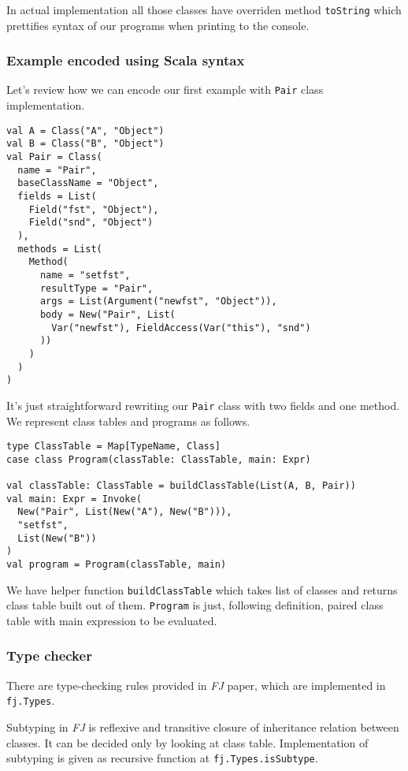 \documentclass{article}[12pt]
\begin{document}
In actual implementation all those classes have overriden
method \texttt{toString} which prettifies syntax of our
programs when printing to the console.

\subsubsection{Example encoded using Scala syntax}

Let's review how we can encode our first example with
\texttt{Pair} class implementation.

\begin{verbatim}
val A = Class("A", "Object")
val B = Class("B", "Object")
val Pair = Class(
  name = "Pair",
  baseClassName = "Object",
  fields = List(
    Field("fst", "Object"),
    Field("snd", "Object")
  ),
  methods = List(
    Method(
      name = "setfst",
      resultType = "Pair",
      args = List(Argument("newfst", "Object")),
      body = New("Pair", List(
        Var("newfst"), FieldAccess(Var("this"), "snd")
      ))
    )
  )
)
\end{verbatim}
It's just straightforward rewriting our \texttt{Pair} class
with two fields and one method. We represent class tables and
programs as follows.

\begin{verbatim}
type ClassTable = Map[TypeName, Class]
case class Program(classTable: ClassTable, main: Expr)

val classTable: ClassTable = buildClassTable(List(A, B, Pair))
val main: Expr = Invoke(
  New("Pair", List(New("A"), New("B"))),
  "setfst",
  List(New("B"))
)
val program = Program(classTable, main)
\end{verbatim}

We have helper function \texttt{buildClassTable} which takes list
of classes and returns class table built out of them.
\texttt{Program} is just, following definition, paired class table
with main expression to be evaluated.

\subsubsection{Type checker}

There are type-checking rules provided in \emph{FJ} paper, which
are implemented in \texttt{fj.Types}.

Subtyping in \emph{FJ} is reflexive and transitive closure of
inheritance relation between classes. It can be decided only by
looking at class table. Implementation of subtyping is given as
recursive function at \texttt{fj.Types.isSubtype}.
\end{document}
